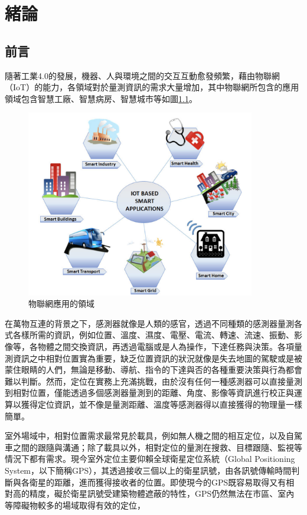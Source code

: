 \chapter{緒論}


\section{前言} %

隨著工業4.0的發展，機器、人與環境之間的交互互動愈發頻繁，藉由物聯網（IoT）的能力，各領域對於量測資訊的需求大量增加，其中物聯網所包含的應用領域包含智慧工廠、智慧病房、智慧城市等如圖\ref{pic:iot}\cite{iot}。

\begin{figure}[ht]
    \centering
    \includegraphics[width=10cm]{ch1pic/iot.png}
    \caption{物聯網應用的領域\cite{iot}}
    \label{pic:iot}
\end{figure}

在萬物互連的背景之下，感測器就像是人類的感官，透過不同種類的感測器量測各式各樣所需的資訊，例如位置、溫度、濕度、電壓、電流、轉速、流速、振動、影像等，各物體之間交換資訊，再透過電腦或是人為操作，下達任務與決策。各項量測資訊之中相對位置實為重要，缺乏位置資訊的狀況就像是失去地圖的駕駛或是被蒙住眼睛的人們，無論是移動、導航、指令的下達與否的各種重要決策與行為都會難以判斷。然而，定位在實務上充滿挑戰，由於沒有任何一種感測器可以直接量測到相對位置，僅能透過多個感測器量測到的距離、角度、影像等資訊進行校正與運算以獲得定位資訊，並不像是量測距離、溫度等感測器得以直接獲得的物理量一樣簡單。



室外場域中，相對位置需求最常見於載具，例如無人機之間的相互定位，以及自駕車之間的跟隨與溝通；除了載具以外，相對定位的量測在搜救、目標跟隨、監視等情況下都有需求\cite{outdoor_scenario}。現今室外定位主要仰賴全球衛星定位系統（Global Positioning System，以下簡稱GPS）\cite{GPS_important}，其透過接收三個以上的衛星訊號，由各訊號傳輸時間判斷與各衛星的距離，進而獲得接收者的位置。即使現今的GPS既容易取得又有相對高的精度\cite{survey_light2020}，礙於衛星訊號受建築物體遮蔽的特性，GPS仍然無法在市區、室內等障礙物較多的場域取得有效的定位\cite{survey_light2018}，


